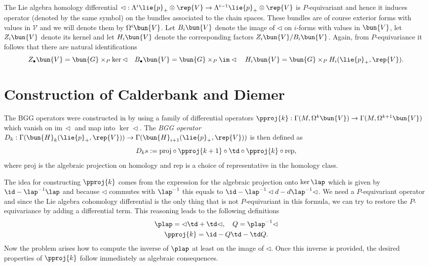 The Lie algebra homology differential $\lhd:\Lambda^i \lie{p}_+ \otimes \rep{V} \to \Lambda^{i-1} \lie{p}_+ \otimes \rep{V}$ is $P$-equivariant and hence it induces operator (denoted by the same symbol) on the bundles associated to the chain spaces. These bundles are of course exterior forms with values in $\mathcal{V}$ and we will denote them by $\Omega^i\bun{V}$. Let $B_i\bun{V}$ denote the image of $\lhd$ on $i$-forms with values in $\bun{V}$, let $Z_i\bun{V}$ denote its kernel and let $H_i\bun{V}$ denote the corresponding factors $Z_i\bun{V}/B_i\bun{V}$. Again, from $P$-equivariance it follows that there are natural identifications
\[
 Z_\bullet\bun{V}=\bun{G}\times_P \ker \lhd \quad B_\bullet\bun{V}=\bun{G}\times_P \im \lhd \quad H_i\bun{V} = \bun{G}\times_P H_i(\lie{p}_+,\rep{V}).
\]

\section{Construction of Calderbank and Diemer}

The BGG operators were constructed in \cite{calderbank_differential_2001} by using a family of differential operators $\pproj{k}: \Gamma(M,\Omega^k\bun{V}) \to \Gamma(M,\Omega^{k+1}\bun{V})$ which vanish on $\mathrm{im}\,\lhd$ and map into $\ker \lhd$. The \emph{BGG operator} $D_k: \Gamma(\bun{H}_k(\lie{p}_+,\rep{V}))\to\Gamma(\bun{H}_{i+1}(\lie{p}_+,\rep{V}))$ is then defined as \[D_k s := \mathrm{proj} \circ\pproj{k+1} \circ \td \circ \pproj{k} \circ \mathrm{rep},\] where $\mathrm{proj}$ is the algebraic projection on homology and $\mathrm{rep}$ is a choice of representative in the homology class.

The idea for constructing $\pproj{k}$ comes from the expression for the algebraic projection onto $\ker \lap$ which is given by $\id - \lap^{-1}\lap$ and because $\lhd$ commutes with $\lap^{-1}$ this equals to $\id -\lap^{-1}\lhd d - d \lap^{-1} \lhd$.  We need a $P$-equivariant operator and since the Lie algebra cohomology differential is the only thing that is not $P$-equivariant in this formula, we can try to restore the $P$-equivariance by adding a differential term. This reasoning leads to the following definitions
\begin{gather*}
 \plap = \lhd \td + \td \lhd,\quad Q = \plap^{-1}\lhd \\
  \pproj{k} = \id - Q\td - \td Q.
\end{gather*} Now the problem arises how to compute the inverse of $\plap$ at least on the image of $\lhd$. Once this inverse is provided, the desired properties of $\pproj{k}$ follow immediately as algebraic consequences. %

